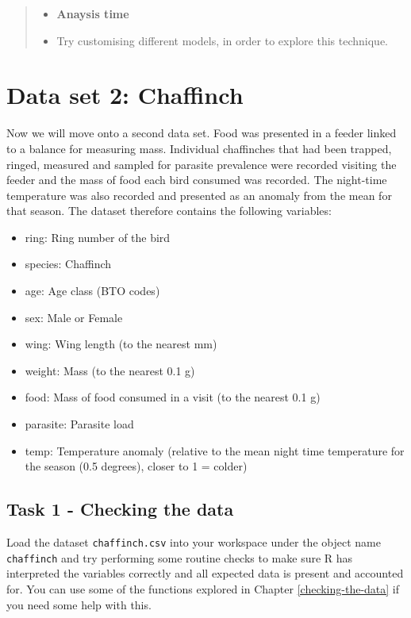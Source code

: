 \documentclass[
]{book}
\providecommand{\tightlist}{%
  \setlength{\itemsep}{0pt}\setlength{\parskip}{0pt}}
\begin{document}
\begin{quote}
\begin{itemize}
\tightlist
\item
  \textbf{Anaysis time}
\item
  Try customising different models, in order to explore this technique.
\end{itemize}
\end{quote}

\section{Data set 2: Chaffinch}\label{data-set-2-chaffinch}

Now we will move onto a second data set. Food was presented in a feeder linked to a balance for measuring mass. Individual chaffinches that had been trapped, ringed, measured and sampled for parasite prevalence were recorded visiting the feeder and the mass of food each bird consumed was recorded. The night-time temperature was also recorded and presented as an anomaly from the mean for that season. The dataset therefore contains the following variables:

\begin{itemize}
\tightlist
\item
  ring: Ring number of the bird
\item
  species: Chaffinch
\item
  age: Age class (BTO codes)
\item
  sex: Male or Female
\item
  wing: Wing length (to the nearest mm)
\item
  weight: Mass (to the nearest 0.1 g)
\item
  food: Mass of food consumed in a visit (to the nearest 0.1 g)
\item
  parasite: Parasite load
\item
  temp: Temperature anomaly (relative to the mean night time temperature for the season (0.5 degrees), closer to 1 = colder)
\end{itemize}

\subsection{Task 1 - Checking the data}\label{task-1---checking-the-data-1}

Load the dataset \texttt{chaffinch.csv} into your workspace under the object name \texttt{chaffinch} and try performing some routine checks to make sure R has interpreted the variables correctly and all expected data is present and accounted for. You can use some of the functions explored in Chapter \ref{checking-the-data} if you need some help with this.
\end{document}
